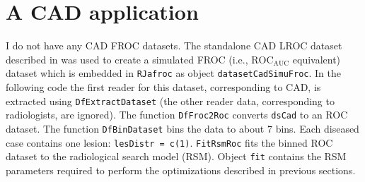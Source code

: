 \documentclass[
]{book}
\newenvironment{Shaded}{\begin{snugshade}}{\end{snugshade}}
\newcommand{\CommentTok}[1]{\textcolor[rgb]{0.56,0.35,0.01}{\textit{#1}}}
\newcommand{\DataTypeTok}[1]{\textcolor[rgb]{0.13,0.29,0.53}{#1}}
\newcommand{\DecValTok}[1]{\textcolor[rgb]{0.00,0.00,0.81}{#1}}
\newcommand{\KeywordTok}[1]{\textcolor[rgb]{0.13,0.29,0.53}{\textbf{#1}}}
\newcommand{\NormalTok}[1]{#1}
\newcommand{\OperatorTok}[1]{\textcolor[rgb]{0.81,0.36,0.00}{\textbf{#1}}}
\newcommand{\StringTok}[1]{\textcolor[rgb]{0.31,0.60,0.02}{#1}}
\begin{document}
\hypertarget{optim-op-point-application}{%
\section{A CAD application}\label{optim-op-point-application}}

I do not have any CAD FROC datasets. The standalone CAD LROC dataset described in \citep{hupse2013standalone} was used to create a simulated FROC (i.e., \(\text{ROC}_\text{AUC}\) equivalent) dataset which is embedded in \texttt{RJafroc} as object \texttt{datasetCadSimuFroc}. In the following code the first reader for this dataset, corresponding to CAD, is extracted using \texttt{DfExtractDataset} (the other reader data, corresponding to radiologists, are ignored). The function \texttt{DfFroc2Roc} converts \texttt{dsCad} to an ROC dataset. The function \texttt{DfBinDataset} bins the data to about 7 bins. Each diseased case contains one lesion: \texttt{lesDistr\ =\ c(1)}. \texttt{FitRsmRoc} fits the binned ROC dataset to the radiological search model (RSM). Object \texttt{fit} contains the RSM parameters required to perform the optimizations described in previous sections.

\begin{Shaded}
\end{Shaded}
\end{document}
